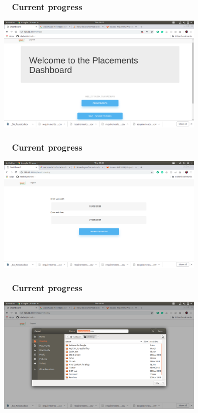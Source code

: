 \documentclass{beamer}
\begin{document}
\begin{frame}
\frametitle{ ~ Current progress}
\begin{center}
\includegraphics[width = 10cm]{2.png}
\end{center}
\end{frame}


\begin{frame}
\frametitle{ ~ Current progress}
\begin{center}
\includegraphics[width = 10cm]{3.png}
\end{center}
\end{frame}

\begin{frame}
\frametitle{ ~ Current progress}
\begin{center}
\includegraphics[width = 10cm]{4.png}
\end{center}
\end{frame}
\end{document}

